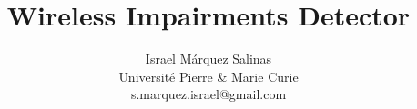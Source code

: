\documentclass[sigconf]{Template}
\begin{document}
\title{Wireless Impairments Detector}
\author{Israel M\'{a}rquez Salinas \\Universit\'{e} Pierre \& Marie Curie \\s.marquez.israel@gmail.com}
\maketitle










\end{document}
